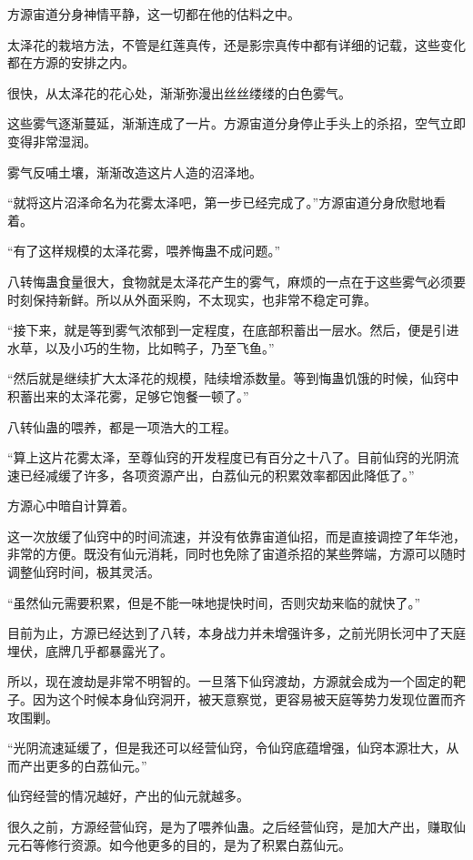 \begin{this_body}
方源宙道分身神情平静，这一切都在他的估料之中。

太泽花的栽培方法，不管是红莲真传，还是影宗真传中都有详细的记载，这些变化都在方源的安排之内。

很快，从太泽花的花心处，渐渐弥漫出丝丝缕缕的白色雾气。

这些雾气逐渐蔓延，渐渐连成了一片。方源宙道分身停止手头上的杀招，空气立即变得非常湿润。

雾气反哺土壤，渐渐改造这片人造的沼泽地。

“就将这片沼泽命名为花雾太泽吧，第一步已经完成了。”方源宙道分身欣慰地看着。

“有了这样规模的太泽花雾，喂养悔蛊不成问题。”

八转悔蛊食量很大，食物就是太泽花产生的雾气，麻烦的一点在于这些雾气必须要时刻保持新鲜。所以从外面采购，不太现实，也非常不稳定可靠。

“接下来，就是等到雾气浓郁到一定程度，在底部积蓄出一层水。然后，便是引进水草，以及小巧的生物，比如鸭子，乃至飞鱼。”

“然后就是继续扩大太泽花的规模，陆续增添数量。等到悔蛊饥饿的时候，仙窍中积蓄出来的太泽花雾，足够它饱餐一顿了。”

八转仙蛊的喂养，都是一项浩大的工程。

“算上这片花雾太泽，至尊仙窍的开发程度已有百分之十八了。目前仙窍的光阴流速已经减缓了许多，各项资源产出，白荔仙元的积累效率都因此降低了。”

方源心中暗自计算着。

这一次放缓了仙窍中的时间流速，并没有依靠宙道仙招，而是直接调控了年华池，非常的方便。既没有仙元消耗，同时也免除了宙道杀招的某些弊端，方源可以随时调整仙窍时间，极其灵活。

“虽然仙元需要积累，但是不能一味地提快时间，否则灾劫来临的就快了。”

目前为止，方源已经达到了八转，本身战力并未增强许多，之前光阴长河中了天庭埋伏，底牌几乎都暴露光了。

所以，现在渡劫是非常不明智的。一旦落下仙窍渡劫，方源就会成为一个固定的靶子。因为这个时候本身仙窍洞开，被天意察觉，更容易被天庭等势力发现位置而齐攻围剿。

“光阴流速延缓了，但是我还可以经营仙窍，令仙窍底蕴增强，仙窍本源壮大，从而产出更多的白荔仙元。”

仙窍经营的情况越好，产出的仙元就越多。

很久之前，方源经营仙窍，是为了喂养仙蛊。之后经营仙窍，是加大产出，赚取仙元石等修行资源。如今他更多的目的，是为了积累白荔仙元。


\end{this_body}
